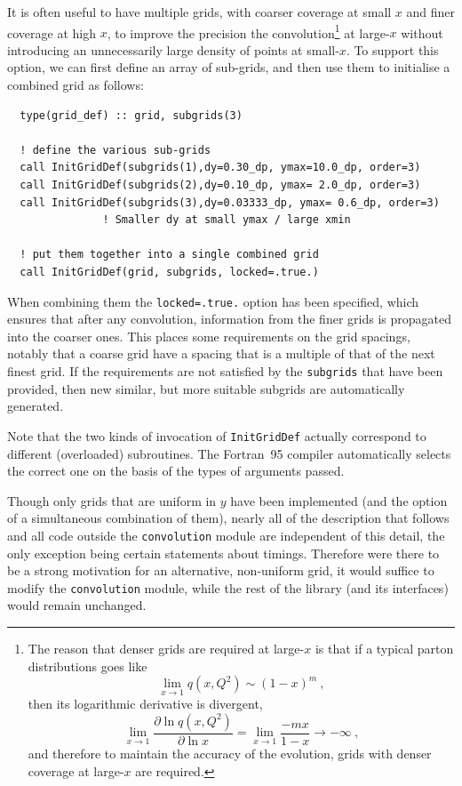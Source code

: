 \documentclass[12pt]{article}
\newcommand{\be}{\begin{equation}}
\newcommand{\ee}{\end{equation}}
\newcommand{\ttt}[1]{\texttt{#1}}
\begin{document}
It is often useful to have multiple grids, with
coarser coverage at small $x$ and finer coverage at high $x$, to
improve the precision the convolution\footnote{
The reason that denser grids are required at large-$x$ is that
if a typical parton distributions goes like
\be
\lim_{x\to 1} q(x,Q^2) \sim (1-x)^m \ ,
\ee
then its logarithmic derivative is divergent,
\be
\lim_{x \to 1} \frac{\partial  \ln q(x,Q^2) }{\partial \ln x} = 
\lim_{x \to 1} \frac{-mx}{1-x} \to -\infty \ ,
\ee
and therefore to maintain the accuracy of the evolution, grids
with denser coverage at large-$x$ are required.} at large-$x$ without
introducing an unnecessarily large density of points
at small-$x$.
To support
this option, we can first define an array of sub-grids, and then use them to
initialise a combined grid as follows:
\begin{lstlisting}
  type(grid_def) :: grid, subgrids(3)

  ! define the various sub-grids
  call InitGridDef(subgrids(1),dy=0.30_dp, ymax=10.0_dp, order=3)
  call InitGridDef(subgrids(2),dy=0.10_dp, ymax= 2.0_dp, order=3)
  call InitGridDef(subgrids(3),dy=0.03333_dp, ymax= 0.6_dp, order=3) 
               ! Smaller dy at small ymax / large xmin 

  ! put them together into a single combined grid
  call InitGridDef(grid, subgrids, locked=.true.)
\end{lstlisting}
When combining them the \ttt{locked=.true.} option has been specified,
which ensures that after any convolution, information from the finer
grids is propagated into the coarser ones. This places some
requirements on the grid spacings, notably that a coarse grid have a
spacing that is a multiple of that of the next finest grid. If the
requirements are not satisfied by the \ttt{subgrids} that have been
provided, then new similar, but more suitable subgrids are
automatically generated. 

Note that the two kinds of invocation of \ttt{InitGridDef} actually
correspond to different (overloaded) subroutines. The Fortran~95 compiler
automatically selects the correct one on the basis of the types of
arguments passed.

Though only grids that are uniform in $y$ have been implemented
(and the option of a simultaneous combination of them),
nearly all of the description that follows and all code outside the
\texttt{convolution} module are independent of this detail, the only
exception being certain statements about timings. Therefore were
there to be a strong motivation for an alternative, non-uniform grid,
it would suffice to modify the \texttt{convolution} module, while the
rest of the library (and its interfaces) would remain unchanged.
\end{document}
